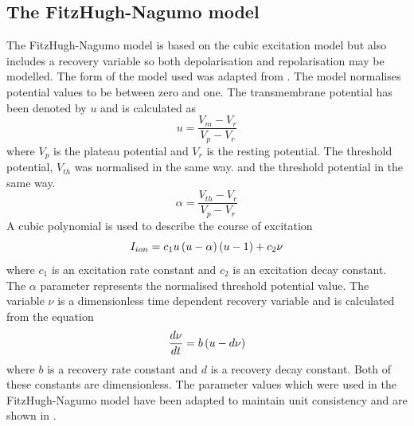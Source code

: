 \subsection{The FitzHugh-Nagumo model}
\label{The_FitzHugh-Nagumo_Model}
The FitzHugh-Nagumo model is based on the cubic excitation model but also includes a recovery
variable so both depolarisation and repolarisation may be modelled. The form
of the model used was adapted from . The model
normalises potential values to be between zero and one. The transmembrane
potential has been denoted by $u$ and is calculated as
\begin{equation}
  u = \dfrac{V_m - V_r}{V_p - V_r}
\end{equation}
where $V_p$ is the plateau potential and $V_r$ is the resting potential. The
threshold potential, $V_{th}$ was normalised in the same way.
and the threshold potential in the same way.
\begin{equation}
  \alpha = \dfrac{V_{th} - V_r}{V_p - V_r}
\end{equation}
A cubic polynomial is used to describe the course of excitation
\begin{equation}
  I_{ion} = c_1 u \left( u - \alpha \right) \left( u - 1 \right) + c_2 \nu
  \label{eqn:FHN_excitation_equation}
\end{equation}
where $c_1$ is an excitation rate constant and $c_2$ is an excitation decay
constant. The $\alpha$ parameter represents the normalised threshold potential
value. The variable $\nu$ is a dimensionless time dependent recovery variable and is
calculated from the equation 
\begin{equation}
   \dfrac{ d \nu}{d t}  = b \left( u - d \nu \right)
\end{equation}
where $b$ is a recovery rate constant and $d$ is a recovery decay
constant. Both of these constants are dimensionless. The parameter values which
were used in the FitzHugh-Nagumo model 
have been adapted to maintain unit consistency and are shown in
. 
